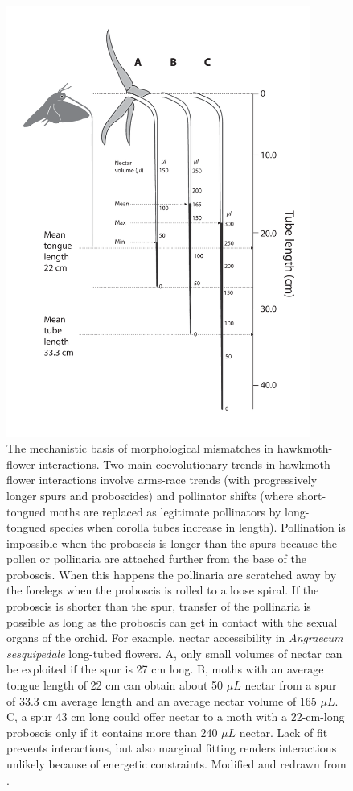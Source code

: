 \documentclass[a4paper,12pt]{article}
\begin{document}
\begin{figure}[h!]
  \caption{The mechanistic basis of morphological mismatches in hawkmoth-flower interactions. Two main coevolutionary trends in hawkmoth-flower interactions involve arms-race trends (with progressively longer spurs and proboscides) and pollinator shifts (where short-tongued moths are replaced as legitimate pollinators by long-tongued species when corolla tubes increase in length). Pollination is impossible when the proboscis is longer than the spurs because the pollen or pollinaria are attached further from the base of the proboscis. When this happens the pollinaria are scratched away by the forelegs when the proboscis is rolled to a loose spiral. If the proboscis is shorter than the spur, transfer of the pollinaria is possible as long as the proboscis can get in contact with the sexual organs of the orchid. For example, nectar accessibility in \textit{Angraecum sesquipedale} long-tubed flowers. A,  only small volumes of nectar can be exploited if the spur is 27 cm long. B, moths with an average tongue length of 22 cm can obtain about 50 $\mu L$ nectar from a spur of 33.3 cm average length and an average nectar volume of 165 $\mu L$. C, a spur 43 cm long could offer nectar to a moth with a 22-cm-long proboscis only if it contains more than 240 $\mu L$ nectar. Lack of fit prevents interactions, but also marginal fitting renders interactions unlikely because of energetic constraints. Modified and redrawn from \citep{Arditti:2012}.}
  \label{Fig2}
  \begin{center}
    \includegraphics[width=10cm]{Fig2}
  \end{center}
\end{figure}
\end{document}
